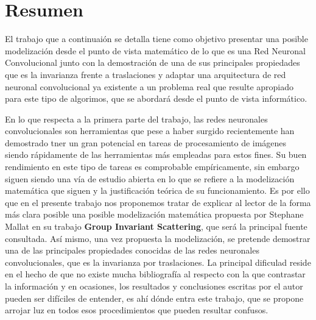 %


\chapter{Resumen}

\noindent El trabajo que a continuaión se detalla tiene como objetivo presentar una posible modelización desde el punto de vista matemático de lo que es una Red Neuronal Convolucional junto con la demostración de una de sus principales propiedades que es la invarianza frente a traslaciones y adaptar una arquitectura de red neuronal convolucional ya existente a un problema real que resulte apropiado para este tipo de algorimos, que se abordará desde el punto de vista informático.

\medskip

\noindent En lo que respecta a la primera parte del trabajo, las redes neuronales convolucionales son herramientas que pese a haber surgido recientemente han demostrado tner un gran potencial en tareas de procesamiento de imágenes siendo rápidamente de las herramientas más empleadas para estos fines. Su buen rendimiento en este tipo de tareas es comprobable empíricamente, sin embargo siguen siendo una vía de estudio abierta en lo que se refiere a la modelización matemática que siguen y la justificación teórica de su funcionamiento. Es por ello que en el presente trabajo nos proponemos tratar de explicar al lector de la forma más clara posible una posible modelización matemática propuesta por Stephane Mallat en su trabajo \textbf{Group Invariant Scattering}, que será la principal fuente consultada. Así mismo, una vez propuesta la modelización, se pretende demostrar una de las principales propiedades conocidas de las redes neuronales convolucionales, que es la invarianza por traslaciones. La principal dificulad reside en el hecho de que no existe mucha bibliografía al respecto con la que contrastar la información y en ocasiones, los resultados y conclusiones escritas por el autor pueden ser difíciles de entender, es ahí dónde entra este trabajo, que se propone arrojar luz en todos esos procedimientos que pueden resultar confusos.

